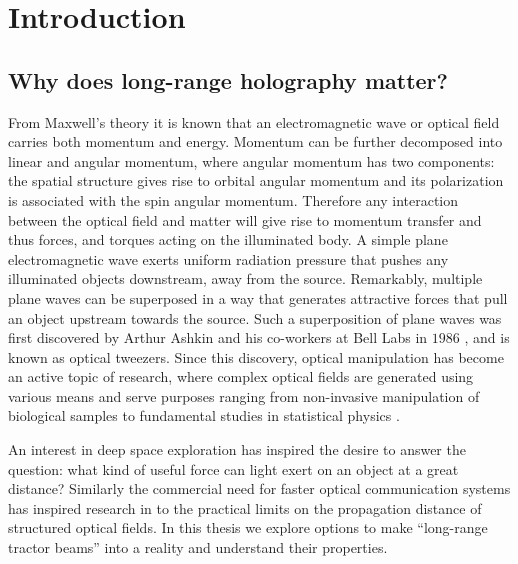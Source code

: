 \chapter{Introduction}
\label{ch:intro}



\section{Why does long-range holography matter?}

From Maxwell's theory it is known that an electromagnetic wave or optical field carries both momentum and energy. Momentum can be further decomposed into linear and angular momentum, where angular momentum has two components: the spatial structure gives rise to orbital angular momentum \cite{Yao2011} and its polarization is associated with the spin angular momentum. Therefore any interaction between the optical field and matter will give rise to momentum transfer and thus forces, and torques acting on the illuminated body. A simple plane electromagnetic wave exerts uniform radiation pressure that pushes any illuminated objects downstream, away from the source. Remarkably, multiple plane waves can be superposed in a way that generates attractive forces that pull an object upstream towards the source. Such a superposition of plane waves was first discovered by Arthur Ashkin and his co-workers at Bell Labs in $1986$ \cite{beth1936}, and is known as optical tweezers. Since this discovery, optical manipulation has become an active topic of research, where complex optical fields are generated using various means and serve purposes ranging from non-invasive manipulation of biological samples to fundamental studies in statistical physics \cite{Volpe:09,Sanchez2019,Leibler1994, Dipankar2019, Silvia2006, anna2016, Bowman_2013}.


An interest in deep space exploration has inspired the desire to answer the question: what kind of useful force can light exert on an object at a great distance? Similarly the commercial need for faster optical communication systems has inspired research in to the practical limits on the propagation distance of structured optical fields. In this thesis we explore options to make ``long-range tractor beams'' into a reality and understand their properties.


